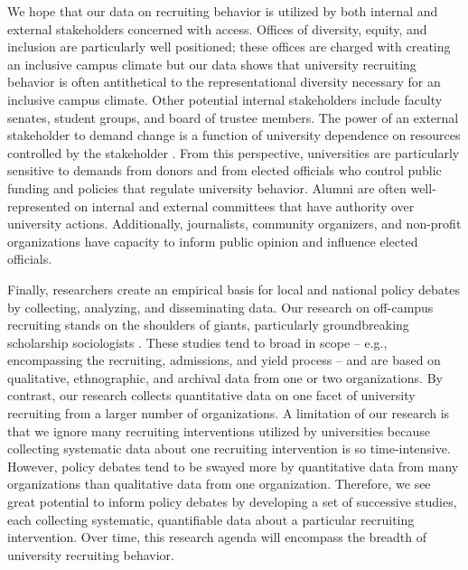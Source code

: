 \documentclass[twoside]{article}
\begin{document}
We hope that our data on recruiting behavior is utilized by both internal and external stakeholders concerned with access.  Offices of diversity, equity, and inclusion are particularly well positioned; these offices are charged with creating an inclusive campus climate but our data shows that university recruiting behavior is often antithetical to the representational diversity necessary for an inclusive campus climate.  Other potential internal stakeholders include faculty senates, student groups, and board of trustee members.  The power of an external stakeholder to demand change is a function of university dependence on resources controlled by the stakeholder \citep{RN959}. From this perspective, universities are particularly sensitive to demands from donors and from elected officials who control public funding and policies that regulate university behavior.  Alumni are often well-represented on internal and external committees that have authority over university actions.  Additionally, journalists, community organizers, and non-profit organizations have capacity to inform public opinion and influence elected officials.

Finally, researchers create an empirical basis for local and national policy debates by collecting, analyzing, and disseminating data.  Our research on off-campus recruiting stands on the shoulders of giants, particularly groundbreaking scholarship sociologists \citep[e.g., ][]{RN3519,RN4407,RN4324}. These studies tend to broad in scope -- e.g., encompassing the recruiting, admissions, and yield process -- and are based on qualitative, ethnographic, and archival data from one or two organizations. By contrast, our research collects quantitative data on one facet of university recruiting from a larger number of organizations. A limitation of our research is that we ignore many recruiting interventions utilized by universities because collecting systematic data about one recruiting intervention is so time-intensive. However, policy debates tend to be swayed more by quantitative data from many organizations than qualitative data from one organization. Therefore, we see great potential to inform policy debates by developing a set of successive studies, each collecting systematic, quantifiable data about a particular recruiting intervention. Over time, this research agenda will encompass the breadth of university recruiting behavior.
\end{document}
